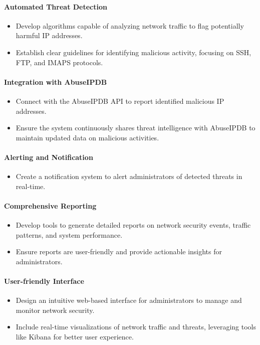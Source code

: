 \documentclass{article}
\begin{document}
    \paragraph{Automated Threat Detection}
    \begin{itemize}
        \item Develop algorithms capable of analyzing network traffic to flag potentially harmful IP addresses.
        \item Establish clear guidelines for identifying malicious activity, focusing on SSH, FTP, and IMAPS protocols.
    \end{itemize}

    \paragraph{Integration with AbuseIPDB}
    \begin{itemize}
        \item Connect with the AbuseIPDB API to report identified malicious IP addresses.
        \item Ensure the system continuously shares threat intelligence with AbuseIPDB to maintain updated data on malicious activities.
    \end{itemize}

    \paragraph{Alerting and Notification}
    \begin{itemize}
        \item Create a notification system to alert administrators of detected threats in real-time.
    \end{itemize}

    \paragraph{Comprehensive Reporting}
    \begin{itemize}
        \item Develop tools to generate detailed reports on network security events, traffic patterns, and system performance.
        \item Ensure reports are user-friendly and provide actionable insights for administrators.
    \end{itemize}

    \paragraph{User-friendly Interface}
    \begin{itemize}
        \item Design an intuitive web-based interface for administrators to manage and monitor network security.
        \item Include real-time visualizations of network traffic and threats, leveraging tools like Kibana for better user experience.
    \end{itemize}
\end{document}
